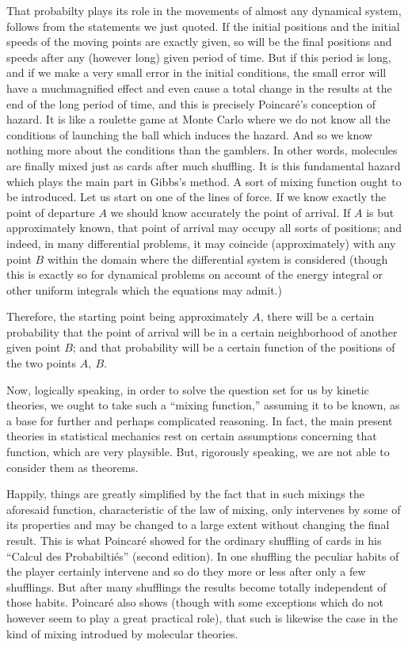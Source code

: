 \documentclass[12pt,oneside]{book}
\begin{document}
That probabilty plays its role in the movements of almost any dynamical system, follows from the statements we just quoted. If the initial positions and the initial speeds of the moving points are exactly given, so will be the final positions and speeds after any (however long) given period of time. But if this period is long, and if we make a very small error in the initial conditions, the small error will have a muchmagnified effect and even cause a total change in the results at the end of the long period of time, and this is precisely Poincar\'e's conception of hazard. It is like a roulette game at Monte Carlo where we do not know all the conditions of launching the ball which induces the hazard. And so we know nothing more about the conditions than the gamblers. In other words, molecules are finally mixed just as cards after much shuffling. It is this fundamental hazard which plays the main part in Gibbs's method. A sort of mixing function ought to be introduced. Let us start on one of the lines of force. If we know exactly the point of departure $A$ we should know accurately the point of arrival. If $A$ is but approximately known, that point of arrival may occupy all sorts of positions; and indeed, in many differential problems, it may coincide (approximately) with any point $B$ within the domain where the differential system is considered (though this is exactly so for dynamical problems on account of the energy integral or other uniform integrals which the equations may admit.) \par

Therefore, the starting point being approximately $A$, there will be a certain probability that the point of arrival will be in a certain neighborhood of another given point $B$; and that probability will be a certain function of the positions of the two points $A,\ B$. \par

Now, logically speaking, in order to solve the question set for us by kinetic theories, we ought to take such a ``mixing function,'' assuming it to be known, as a base for further and perhaps complicated reasoning. In fact, the main present theories in statistical mechanics rest on certain assumptions concerning that function, which are very playsible. But, rigorously speaking, we are not able to consider them as theorems. \par

Happily, things are greatly simplified by the fact that in such mixings the aforesaid function, characteristic of the law of mixing, only intervenes by some of its properties and may be changed to a large extent without changing the final result. This is what Poincar\'e showed for the ordinary shuffling of cards in his ``Calcul des Probabilti\'es'' (second edition). In one shuffling the peculiar habits of the player certainly intervene and so do they more or less after only a few shufflings. But after many shufflings the results become totally independent of those habits. Poincar\'e also shows (though with some exceptions which do not however seem to play a great practical role), that such is likewise the case in the kind of mixing introdued by molecular theories. \par
\end{document}
